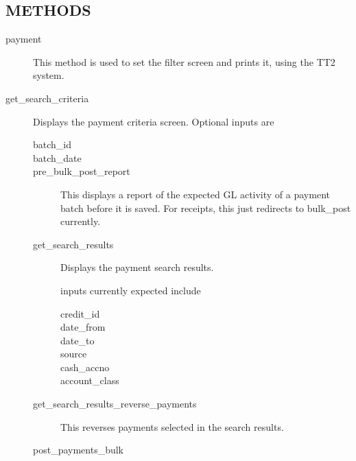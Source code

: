 \subsection*{METHODS\label{LedgerSMB::Scripts::payment_METHODS}}
\begin{description}

\item[{payment}] \mbox{}

This method is used to set the filter screen and prints it, using the 
TT2 system.


\item[{get\_search\_criteria}] \mbox{}

Displays the payment criteria screen.  Optional inputs are

\begin{description}

\item[{batch\_id}] \mbox{}
\item[{batch\_date}] \mbox{}
\item[{pre\_bulk\_post\_report}] \mbox{}

This displays a report of the expected GL activity of a payment batch before it
is saved.  For receipts, this just redirects to bulk\_post currently.


\item[{get\_search\_results}] \mbox{}

Displays the payment search results.



inputs currently expected include

\begin{description}

\item[{credit\_id}] \mbox{}
\item[{date\_from}] \mbox{}
\item[{date\_to}] \mbox{}
\item[{source}] \mbox{}
\item[{cash\_accno}] \mbox{}
\item[{account\_class}] \mbox{}\end{description}

\item[{get\_search\_results\_reverse\_payments}] \mbox{}

This reverses payments selected in the search results.


\item[{post\_payments\_bulk}] \mbox{}


\end{description}
\end{description}
